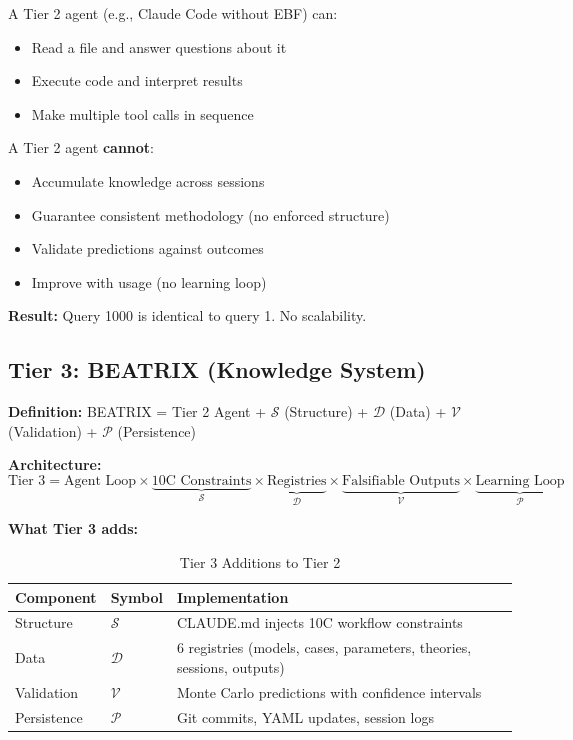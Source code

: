 \begin{tcolorbox}[colback=red!5!white, colframe=red!75!black,
    title=Why Tier 2 Is Not Enough]
A Tier 2 agent (e.g., Claude Code without EBF) can:
\begin{itemize}[nosep]
    \item Read a file and answer questions about it
    \item Execute code and interpret results
    \item Make multiple tool calls in sequence
\end{itemize}

A Tier 2 agent \textbf{cannot}:
\begin{itemize}[nosep]
    \item Accumulate knowledge across sessions
    \item Guarantee consistent methodology (no enforced structure)
    \item Validate predictions against outcomes
    \item Improve with usage (no learning loop)
\end{itemize}

\textbf{Result:} Query 1000 is identical to query 1. No scalability.
\end{tcolorbox}


\subsection{Tier 3: BEATRIX (Knowledge System)}

\textbf{Definition:} BEATRIX = Tier 2 Agent + $\mathcal{S}$ (Structure) + $\mathcal{D}$ (Data) + $\mathcal{V}$ (Validation) + $\mathcal{P}$ (Persistence)

\textbf{Architecture:}
\begin{equation}
\text{Tier 3} = \text{Agent Loop} \times \underbrace{\text{10C Constraints}}_{\mathcal{S}} \times \underbrace{\text{Registries}}_{\mathcal{D}} \times \underbrace{\text{Falsifiable Outputs}}_{\mathcal{V}} \times \underbrace{\text{Learning Loop}}_{\mathcal{P}}
\end{equation}

\textbf{What Tier 3 adds:}

\begin{table}[htbp]
\centering
\caption{Tier 3 Additions to Tier 2}
\renewcommand{\arraystretch}{1.3}
\begin{tabular}{@{}llp{7cm}@{}}
\toprule
\textbf{Component} & \textbf{Symbol} & \textbf{Implementation} \\
\midrule
Structure & $\mathcal{S}$ & CLAUDE.md injects 10C workflow constraints \\
Data & $\mathcal{D}$ & 6 registries (models, cases, parameters, theories, sessions, outputs) \\
Validation & $\mathcal{V}$ & Monte Carlo predictions with confidence intervals \\
Persistence & $\mathcal{P}$ & Git commits, YAML updates, session logs \\
\bottomrule
\end{tabular}
\end{table}

